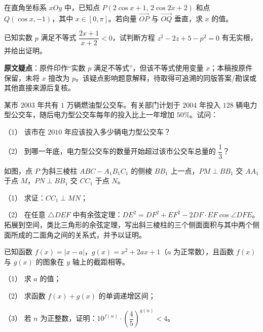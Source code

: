 \begin{question}
在直角坐标系 $xOy$ 中，已知点 $P(2\cos x+1,\,2\cos 2x+2)$ 和点 $Q(\cos x,-1)$，其中 $x\in[0,\pi]$。若向量 $\overrightarrow{OP}$ 与 $\overrightarrow{OQ}$ 垂直，求 $x$ 的值。

\end{question}
\begin{question}
已知实数 $p$ 满足不等式 $\dfrac{2x+1}{x+2}<0$，试判断方程 $z^2-2z+5-p^2=0$ 有无实根，并给出证明。

\begin{gktip}
\textbf{原文疑点}：原件印作“实数 $p$ 满足不等式”，但该不等式使用变量 $x$；本稿按原件保留，未将 $x$ 擅改为 $p$。该疑点影响题意解释，待取得可追溯的同版答案/勘误或其他直接来源后复核。
\end{gktip}

\end{question}
\begin{question}
某市 $2003$ 年共有 $1$ 万辆燃油型公交车。有关部门计划于 $2004$ 年投入 $128$ 辆电力型公交车，随后电力型公交车每年的投入比上一年增加 $50\%$。试问：

（1） 该市在 $2010$ 年应该投入多少辆电力型公交车？

（2） 到哪一年底，电力型公交车的数量开始超过该市公交车总量的 $\dfrac{1}{3}$？

\Needspace{0.4\textheight}
\end{question}
\begin{question}
如图，点 $P$ 为斜三棱柱 $ABC-A_1B_1C_1$ 的侧棱 $BB_1$ 上一点，$PM\perp BB_1$ 交 $AA_1$ 于点 $M$，$PN\perp BB_1$ 交 $CC_1$ 于点 $N$。

（1） 求证：$CC_1\perp MN$；

（2） 在任意 $\triangle DEF$ 中有余弦定理：$DE^2=DF^2+EF^2-2DF\cdot EF\cos\angle DFE$。拓展到空间，类比三角形的余弦定理，写出斜三棱柱的三个侧面面积与其中两个侧面所成的二面角之间的关系式，并予以证明。
\nopagebreak[4]
\begin{center}\end{center}
\nopagebreak[4]
\end{question}
\begin{question}
已知函数 $f(x)=|x-a|$，$g(x)=x^2+2ax+1$（$a$ 为正常数），且函数 $f(x)$ 与 $g(x)$ 的图象在 $y$ 轴上的截距相等。

（1） 求 $a$ 的值；

（2） 求函数 $f(x)+g(x)$ 的单调递增区间；

（3） 若 $n$ 为正整数，证明：$10^{f(n)}\cdot\left(\dfrac{4}{5}\right)^{g(n)}<4$。

\end{question}
